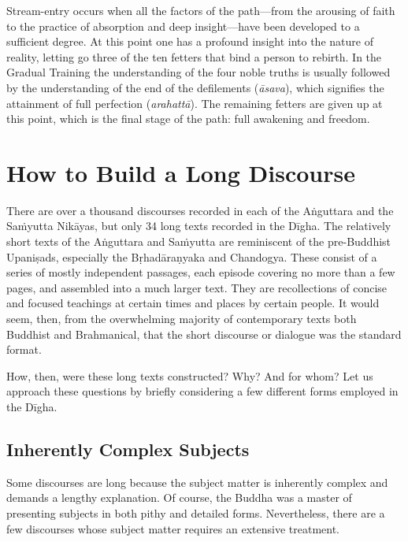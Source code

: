 \documentclass[12pt,openany]{book}%
\begin{document}
Stream-entry occurs when all the factors of the path—from the arousing of faith to the practice of absorption and deep insight—have been developed to a sufficient degree. At this point one has a profound insight into the nature of reality, letting go three of the ten fetters that bind a person to rebirth. In the Gradual Training the understanding of the four noble truths is usually followed by the understanding of the end of the defilements (\textit{\textsanskrit{āsava}}), which signifies the attainment of full perfection (\textit{\textsanskrit{arahattā}}). The remaining fetters are given up at this point, which is the final stage of the path: full awakening and freedom.

\section*{How to Build a Long Discourse}

There are over a thousand discourses recorded in each of the \textsanskrit{Aṅguttara} and the \textsanskrit{Saṁyutta} \textsanskrit{Nikāyas}, but only 34 long texts recorded in the \textsanskrit{Dīgha}. The relatively short texts of the \textsanskrit{Aṅguttara} and \textsanskrit{Saṁyutta} are reminiscent of the pre-Buddhist \textsanskrit{Upaniṣads}, especially the \textsanskrit{Bṛhadāraṇyaka} and Chandogya. These consist of a series of mostly independent passages, each episode covering no more than a few pages, and assembled into a much larger text. They are recollections of concise and focused teachings at certain times and places by certain people. It would seem, then, from the overwhelming majority of contemporary texts both Buddhist and Brahmanical, that the short discourse or dialogue was the standard format.

How, then, were these long texts constructed? Why? And for whom? Let us approach these questions by briefly considering a few different forms employed in the \textsanskrit{Dīgha}.

\subsection*{Inherently Complex Subjects}

Some discourses are long because the subject matter is inherently complex and demands a lengthy explanation. Of course, the Buddha was a master of presenting subjects in both pithy and detailed forms. Nevertheless, there are a few discourses whose subject matter requires an extensive treatment.
\end{document}
